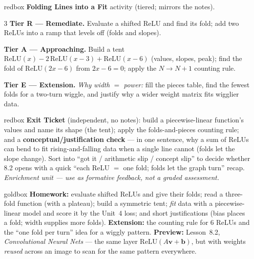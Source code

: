 \documentclass[10pt]{article}
\newcommand{\vv}{\mathbf{v}}
\newcommand{\bb}{\mathbf{b}}
\newcommand{\relu}{\mathrm{ReLU}}
\begin{document}
\begin{skillbox}{redbox}
\textbf{Folding Lines into a Fit} activity (tiered; mirrors the notes).
\begin{multicols}{3}
\textbf{Tier R --- Remediate.} Evaluate a shifted ReLU and find its fold; add two ReLUs into a ramp that
levels off (folds and slopes).

\columnbreak
\textbf{Tier A --- Approaching.} Build a tent $\relu(x)-2\,\relu(x-3)+\relu(x-6)$ (values, slopes, peak);
find the fold of $\relu(2x-6)$ from $2x-6=0$; apply the $N\to N+1$ counting rule.

\columnbreak
\textbf{Tier E --- Extension.} \emph{Why width $=$ power:} fill the pieces table, find the fewest folds for a
two-turn wiggle, and justify why a wider weight matrix fits wigglier data.
\end{multicols}
\end{skillbox}

\begin{skillbox}{redbox}
\textbf{Exit Ticket} (independent, no notes): build a piecewise-linear function's values and name its shape
(the tent); apply the folds-and-pieces counting rule; and a \textbf{conceptual/justification check} --- in
one sentence, why a sum of ReLUs can bend to fit rising-and-falling data when a single line cannot (folds
let the slope change). Sort into ``got it / arithmetic slip / concept slip'' to decide whether 8.2 opens
with a quick ``each ReLU $=$ one fold; folds let the graph turn'' recap. \emph{Enrichment unit --- use as
formative feedback, not a graded assessment.}
\end{skillbox}

\begin{skillbox}{goldbox}
\textbf{Homework:} evaluate shifted ReLUs and give their folds; read a three-fold function (with a plateau);
build a symmetric tent; \emph{fit} data with a piecewise-linear model and score it by the Unit~4 loss; and
short justifications (bias places a fold; width supplies more folds). \textbf{Extension:} the counting rule
for $6$ ReLUs and the ``one fold per turn'' idea for a wiggly pattern. \textbf{Preview:} Lesson~8.2,
\emph{Convolutional Neural Nets} --- the same layer $\relu(A\vv+\bb)$, but with weights \emph{reused} across
an image to scan for the same pattern everywhere.
\end{skillbox}
\end{document}
